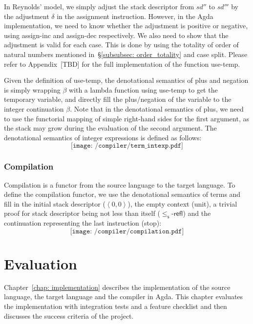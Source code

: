 \documentclass[12pt,a4paper]{report}
\theoremstyle{definition}
\newcommand{\secref}[1]{\S\ref{#1}}
\newcommand{\chapref}[1]{\ref{#1}}
\newcommand{\ang}[1]{\left\langle #1 \right\rangle}
\begin{document}
        In Reynolds' model, we simply adjust the stack descriptor from $sd''$ to $sd'''$ by the adjustment $\delta$ in the assignment instruction. However, in the Agda implementation, we need to know whether the adjustment is positive or negative, using \textsf{assign-inc} and \textsf{assign-dec} respectively. We also need to show that the adjustment is valid for each case. This is done by using the totality of order of natural numbers mentioned in~\secref{subsubsec: order_totality} and case split. Please refer to Appendix~[TBD] for the full implementation of the function \textsf{use-temp}.

        Given the definition of \textsf{use-temp}, the denotational semantics of plus and negation is simply wrapping $\beta$ with a lambda function using \textsf{use-temp} to get the temporary variable, and directly fill the plus/negation of the variable to the integer continuation $\beta$. Note that in the denotational semantics of plus, we need to use the functorial mapping of simple right-hand sides for the first argument, as the stack may grow during the evaluation of the second argument. The denotational semantics of integer expressions is defined as follows:
        \[\texttt{[image: /compiler/term\_intexp.pdf]}\]
        

    \subsection{Compilation} \label{subsec: compilation}
    Compilation is a functor from the source language to the target language. To define the compilation functor, we use the denotational semantics of terms and fill in the initial stack descriptor ($\ang{0, 0}$), the empty context (\textsf{unit}), a trivial proof for stack descriptor being not less than itself ($\mathsf{\mathord{\leq_s}\text{-}refl}$) and the continuation representing the last instruction (\textsf{stop}):
    \[\texttt{[image: /compiler/compilation.pdf]}\]




\chapter{Evaluation}
    \minitoc
    Chapter~\chapref{chap: implementation} describes the implementation of the source language, the target language and the compiler in Agda. This chapter evaluates the implementation with integration tests and a feature checklist and then discusses the success criteria of the project.
\end{document}
